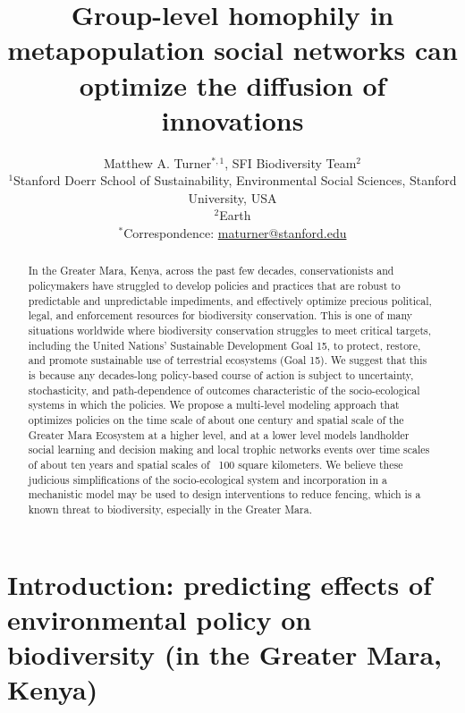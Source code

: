 \documentclass{article}
\theoremstyle{mytheorem}
\theoremstyle{myremark}
\begin{document}
\title{Group-level homophily in metapopulation social networks can optimize the diffusion of innovations}

\author{Matthew A. Turner$^{*,1}$, SFI Biodiversity Team$^{2}$ \\ 
  {\small $^1$Stanford Doerr School of Sustainability,
Environmental Social Sciences, Stanford University, USA \\ \vspace{0.5em}
$^2$Earth} \\ \vspace{0.5em}
{\small $^*$Correspondence: \href{mailto:maturner@stanford.edu}{maturner@stanford.edu}}}
\maketitle

\begin{abstract}
  \noindent
  In the Greater Mara, Kenya, across the past few decades, conservationists and
  policymakers have struggled to develop policies and practices that are robust to
  predictable and unpredictable impediments, and effectively optimize precious
  political, legal, and enforcement resources for biodiversity conservation.
  This is one of many situations worldwide where 
  biodiversity conservation struggles to meet critical targets, including
  the United Nations' Sustainable Development Goal 15, to protect, restore,
  and promote sustainable use of terrestrial ecosystems (Goal
  15).  We suggest that this is because any decades-long policy-based course of
  action is subject to uncertainty, stochasticity,
  and path-dependence of outcomes characteristic of the socio-ecological systems in
  which the policies. We propose a multi-level modeling approach that optimizes policies 
  on the time scale of 
  about one century and spatial scale of the Greater Mara Ecosystem at a higher level,
  and at a lower level models landholder social learning and decision making and
  local trophic networks events over time scales of about ten years and
  spatial scales of ~100 square kilometers. 
  We believe these judicious simplifications of the socio-ecological system and incorporation
  in a mechanistic model may be used to design interventions to reduce fencing, 
  which is a known threat to biodiversity, especially in the Greater Mara.
\end{abstract}


\section{Introduction: predicting effects of environmental policy on 
  biodiversity (in the Greater Mara, Kenya)}
\end{document}
